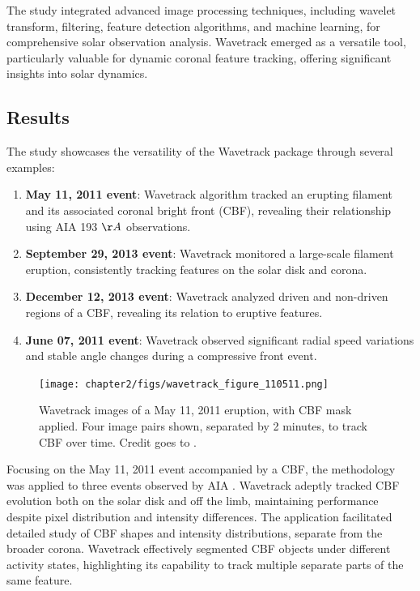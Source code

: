 The study integrated advanced image processing techniques, including wavelet transform, filtering, feature detection algorithms, and machine learning, for comprehensive solar observation analysis. Wavetrack emerged as a versatile tool, particularly valuable for dynamic coronal feature tracking, offering significant insights into solar dynamics.

\subsection{Results}
The study showcases the versatility of the Wavetrack package through several examples:

\begin{enumerate}
	\item \textbf{May 11, 2011 event}:
	Wavetrack algorithm tracked an erupting filament and its associated coronal bright front (CBF), revealing their relationship using AIA 193 $\AA$ observations.
	
	\item \textbf{September 29, 2013 event}: Wavetrack monitored a large-scale filament eruption, consistently tracking features on the solar disk and corona.
	
	\item \textbf{December 12, 2013 event}: Wavetrack analyzed driven and non-driven regions of a CBF, revealing its relation to eruptive features.
	
	\item \textbf{June 07, 2011 event}: Wavetrack observed significant radial speed variations and stable angle changes during a compressive front event.
\end{enumerate}

\begin{figure}[!htp]
	\centering
	\texttt{[image: chapter2/figs/wavetrack\_figure\_110511.png]}
	\caption{Wavetrack images of a May 11, 2011 eruption, with CBF mask applied. Four image pairs shown, separated by 2 minutes, to track CBF over time. Credit goes to \citet{stepanyuk_2022}.}
	\label{fig_wavetrack_cbf_center}
\end{figure}

Focusing on the May 11, 2011 event accompanied by a CBF, the methodology was applied to three events observed by AIA \citep{kozarev_2015, kozarev_2017}. Wavetrack adeptly tracked CBF evolution both on the solar disk and off the limb, maintaining performance despite pixel distribution and intensity differences.
The application facilitated detailed study of CBF shapes and intensity distributions, separate from the broader corona. Wavetrack effectively segmented CBF objects under different activity states, highlighting its capability to track multiple separate parts of the same feature.

